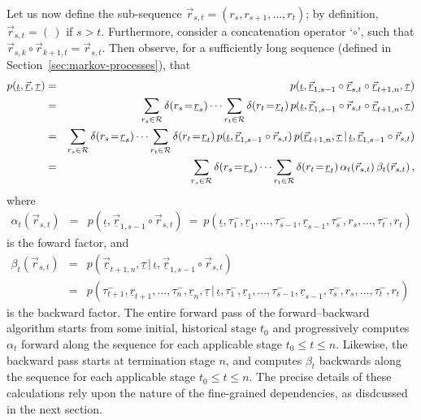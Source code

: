 \documentclass[a4paper]{article}
\newcommand{\ui}{\underline{\iota}}
\newcommand{\ut}{\underline{\tau}}
\newcommand{\ur}{\underline{r}}
\newcommand{\vr}{\vec{r}}
\newcommand{\uvr}{\underline{\vr}}
\newcommand{\tm}{\tau^{-}}
\begin{document}
Let us now define the sub-sequence $\vr_{s,t}=(r_s,r_{s+1},\ldots,r_t)$; by definition,
$\vr_{s,t}=(\,)$ if $s>t$. Furthermore, consider a concatenation operator `$\circ$', such that
$\vr_{s,k}\circ\vr_{k+1,t}=\vr_{s,t}$.
Then observe, for a sufficiently long sequence (defined in Section~\ref{sec:markov-processes}), that
\begin{eqnarray}
p(\ui,\uvr,\ut) 
& = &
p(\ui,\uvr_{1,s-1}\circ\uvr_{s,t}\circ\uvr_{t+1,n},\ut)
\nonumber\\
& = &
\sum_{r_s\in{\cal R}} \delta(r_s\!=\!\ur_s)
\cdots\sum_{r_t\in{\cal R}} \delta(r_t\!=\!\ur_t)
\,p(\ui,\uvr_{1,s-1}\circ\vr_{s,t}\circ\uvr_{t+1,n},\ut)
\nonumber\\
& = &
\sum_{r_s\in{\cal R}} \delta(r_s\!=\!\ur_s)
\cdots\sum_{r_t\in{\cal R}} \delta(r_t\!=\!\ur_t)
\,p(\ui,\uvr_{1,s-1}\circ\vr_{s,t})
\,p(\uvr_{t+1,n},\ut\,|\,\ui,\uvr_{1,s-1}\circ\vr_{s,t})
\nonumber\\
& = &
\sum_{r_s\in{\cal R}} \delta(r_s\!=\!\ur_s)
\cdots\sum_{r_t\in{\cal R}} \delta(r_t\!=\!\ur_t)
\,\alpha_t(\vr_{s,t})\,\beta_t(\vr_{s,t})\,,
\label{eq:alpha:beta}
\end{eqnarray}
where
\begin{eqnarray}
\alpha_t(\vr_{s,t}) & = & p(\ui,\uvr_{1,s-1}\circ\vr_{s,t})~=~p(\ui,\tau_1^-,\ur_1,\ldots,\tm_{s-1},\ur_{s-1},
\tm_s,r_s,\ldots,\tm_t,r_t)
\label{eq:fwd-pass-basic}
\end{eqnarray}
is the foward factor,
and
\begin{eqnarray}
\beta_t(\vr_{s,t}) & = & p(\uvr_{t+1,n},\ut\,|\,\ui,\uvr_{1,s-1}\circ\vr_{s,t})
\nonumber\\& = &
p(\tm_{t+1},\ur_{t+1},\ldots,\tm_n,\ur_n,\ut\,|\,\ui,\tau_1^-,\ur_1,\ldots,\tm_{s-1},\ur_{s-1},
\tm_s,r_s,\ldots,\tm_t,r_t)\
\label{eq:bwd-pass-basic}
\end{eqnarray}
is the backward factor.
The entire forward pass of the forward--backward algorithm starts from some initial, historical stage $t_0$ and
progressively computes $\alpha_t$ forward along the sequence for each applicable stage $t_0\le t\le n$. Likewise,
the backward pass starts at termination stage $n$, and computes $\beta_t$
backwards along the sequence for each applicable stage $t_0\le t\le n$. The precise details of these calculations rely upon
the nature of the fine-grained dependencies, as disdcussed in the next section.

\end{document}
